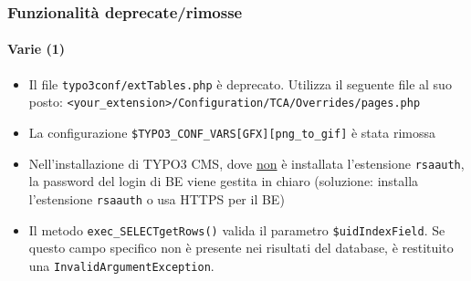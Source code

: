 \begin{frame}[fragile]
	\frametitle{Funzionalità deprecate/rimosse}
	\framesubtitle{Varie (1)}

	\begin{itemize}

		\item Il file \texttt{typo3conf/extTables.php} è deprecato.\newline
			Utilizza il seguente file al suo posto:\newline
			\smaller\texttt{<your\_extension>/Configuration/TCA/Overrides/pages.php}\normalsize

		\item La configurazione \texttt{\$TYPO3\_CONF\_VARS[GFX][png\_to\_gif]} è stata rimossa

		\item Nell'installazione di TYPO3 CMS, dove \underline{non} è installata l'estensione
			\texttt{rsaauth}, la password del login di BE viene gestita in chiaro\newline
			\small(soluzione: installa l'estensione \texttt{rsaauth} o usa HTTPS per il BE)\normalsize

		\item Il metodo \texttt{exec\_SELECTgetRows()} valida il parametro \texttt{\$uidIndexField}.
			Se questo campo specifico non è presente nei risultati del database, è restituito una
			\texttt{InvalidArgumentException}.

	\end{itemize}

\end{frame}


